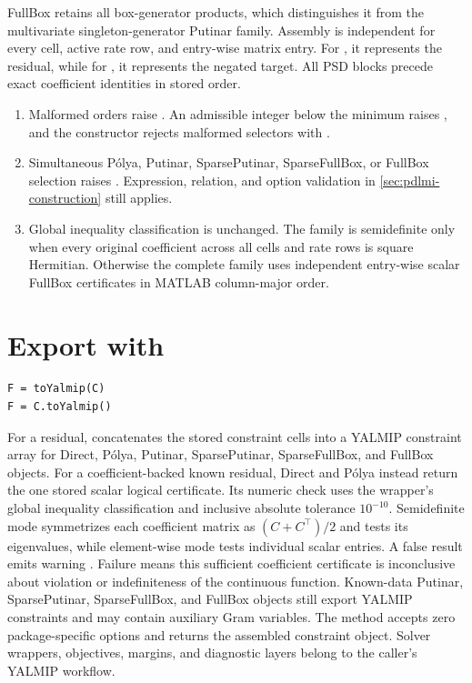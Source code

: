 \remarkshead
FullBox retains all box-generator products, which distinguishes it from the multivariate singleton-generator Putinar family. Assembly is independent for every cell, active rate row, and entry-wise matrix entry. For \code{>=}, it represents the residual, while for \code{<=}, it represents the negated target. All PSD blocks precede exact coefficient identities in stored order.

\begin{enumerate}[leftmargin=*,nosep]
  \item Malformed orders raise . An admissible integer below the minimum raises , and the constructor rejects malformed selectors with \allowbreak{}\allowbreak{}.
  \item Simultaneous P\'olya, Putinar, SparsePutinar, SparseFullBox, or FullBox selection raises \allowbreak{}. Expression, relation, and option validation in \cref{sec:pdlmi-construction} still applies.
  \item Global inequality classification is unchanged. The family is semidefinite only when every original coefficient across all cells and rate rows is square Hermitian. Otherwise the complete family uses independent entry-wise scalar FullBox certificates in MATLAB column-major order.
\end{enumerate}

\section{Export with \texorpdfstring{}{toYalmip}}
\label{sec:pdlmi-toyalmip}

\syntaxhead
\begin{lstlisting}[style=dpsyntax]
F = toYalmip(C)
F = C.toYalmip()
\end{lstlisting}

\arghead For a  residual,  concatenates the stored constraint cells into a YALMIP constraint array for Direct, P\'olya, Putinar, SparsePutinar, SparseFullBox, and FullBox objects. For a coefficient-backed known  residual, Direct and P\'olya instead return the one stored scalar logical certificate. Its numeric check uses the wrapper's global inequality classification and inclusive absolute tolerance $10^{-10}$. Semidefinite mode symmetrizes each coefficient matrix as $(C+C^\top)/2$ and tests its eigenvalues, while element-wise mode tests individual scalar entries. A false result emits warning . Failure means this sufficient coefficient certificate is inconclusive about violation or indefiniteness of the continuous function. Known-data Putinar, SparsePutinar, SparseFullBox, and FullBox objects still export YALMIP constraints and may contain auxiliary Gram variables. The method accepts zero package-specific options and returns the assembled constraint object. Solver wrappers, objectives, margins, and diagnostic layers belong to the caller's YALMIP workflow.


